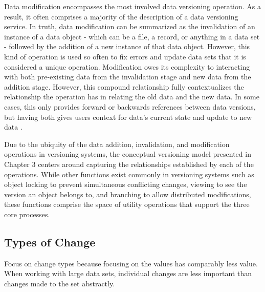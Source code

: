 Data modification encompasses the most involved data versioning operation.
As a result, it often comprises a majority of the description of a data versioning service.
In truth, data modification can be summarized as the invalidation of an instance of a data object - which can be a file, a record, or anything in a data set - followed by the addition of a new instance of that data object.
However, this kind of operation is used so often to fix errors and update data sets that it is considered a unique operation.
Modification owes its complexity to interacting with both pre-existing data from the invalidation stage and new data from the addition stage.
However, this compound relationship fully contextualizes the relationship the operation has in relating the old data and the new data.
In some cases, this only provides forward or backwards references between data versions, but having both gives users context for data's current state and update to new data \cite{Klein01ontologyversioning}.

Due to the ubiquity of the data addition, invalidation, and modification operations in versioning systems, the conceptual versioning model presented in Chapter 3 centers around capturing the relationships established by each of the operations.
While other functions exist commonly in versioning systems such as object locking to prevent simultaneous conflicting changes, viewing to see the version an object belongs to, and branching to allow distributed modifications, these functions comprise the space of utility operations that support the three core processes.

\subsection{Types of Change}

Focus on change types because focusing on the values has comparably less value.
When working with large data sets, individual changes are less important than changes made to the set abstractly.


